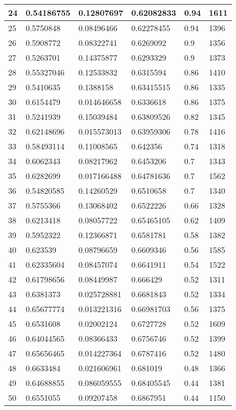 \begin{longtable}{|l|l|l|l|l|l|}
24 & 0.54186755 & 0.12807697 & 0.62082833 & 0.94 & 1611 \\ \hline 
25 & 0.5750848 & 0.08496466 & 0.62278455 & 0.94 & 1396 \\ \hline 
26 & 0.5908772 & 0.08322741 & 0.6269092 & 0.9 & 1356 \\ \hline 
27 & 0.5263701 & 0.14375877 & 0.6293329 & 0.9 & 1373 \\ \hline 
28 & 0.55327046 & 0.12533832 & 0.6315594 & 0.86 & 1410 \\ \hline 
29 & 0.5410635 & 0.1388158 & 0.63415515 & 0.86 & 1335 \\ \hline 
30 & 0.6154479 & 0.014646658 & 0.6336618 & 0.86 & 1375 \\ \hline 
31 & 0.5241939 & 0.15039484 & 0.63809526 & 0.82 & 1345 \\ \hline 
32 & 0.62148696 & 0.015573013 & 0.63959306 & 0.78 & 1416 \\ \hline 
33 & 0.58493114 & 0.11008565 & 0.642356 & 0.74 & 1318 \\ \hline 
34 & 0.6062343 & 0.08217962 & 0.6453206 & 0.7 & 1343 \\ \hline 
35 & 0.6282699 & 0.017166488 & 0.64781636 & 0.7 & 1562 \\ \hline 
36 & 0.54820585 & 0.14260529 & 0.6510658 & 0.7 & 1340 \\ \hline 
37 & 0.5755366 & 0.13068402 & 0.6522226 & 0.66 & 1328 \\ \hline 
38 & 0.6213418 & 0.08057722 & 0.65465105 & 0.62 & 1409 \\ \hline 
39 & 0.5952322 & 0.12366871 & 0.6581781 & 0.58 & 1382 \\ \hline 
40 & 0.623539 & 0.08796659 & 0.6609346 & 0.56 & 1585 \\ \hline 
41 & 0.62335604 & 0.08457074 & 0.6641911 & 0.54 & 1522 \\ \hline 
42 & 0.61798656 & 0.08449987 & 0.666429 & 0.52 & 1311 \\ \hline 
43 & 0.6381373 & 0.025728881 & 0.6681843 & 0.52 & 1334 \\ \hline 
44 & 0.65677774 & 0.013221316 & 0.66981703 & 0.56 & 1375 \\ \hline 
45 & 0.6531608 & 0.02002124 & 0.6727728 & 0.52 & 1609 \\ \hline 
46 & 0.64044565 & 0.08366433 & 0.6756746 & 0.52 & 1399 \\ \hline 
47 & 0.65656465 & 0.014227364 & 0.6787416 & 0.52 & 1480 \\ \hline 
48 & 0.6633484 & 0.021606961 & 0.681019 & 0.48 & 1366 \\ \hline 
49 & 0.64688855 & 0.086059555 & 0.68405545 & 0.44 & 1381 \\ \hline 
50 & 0.6551055 & 0.09207458 & 0.6867951 & 0.44 & 1150 \\ \hline 
\end{longtable}